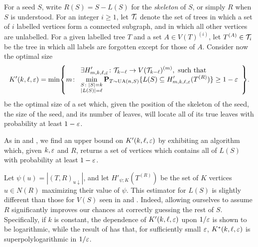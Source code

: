 
For a seed $S$, write $R(S) = S - L(S)$ for the \emph{skeleton} of
$S$, or simply $R$ when $S$ is understood. For an integer $i \ge 1$,
let $\mathcal{T}_i$ denote the set of trees in which a set of $i$ labelled
vertices form a connected subgraph, and in which all other vertices
are unlabelled. For a given labelled tree $T$ and a set
$A \in V(T)^{(i)}$, let $T^{(A)} \in \mathcal{T}_i$ be the tree in which all
labels are forgotten except for those of $A$. Consider now the optimal
size
\[
  K'(k, \ell, \eps) = \min\left\{ m \colon 
    \begin{array}{l} \displaystyle
      \exists H'_{m, k, \ell, \eps}
  \colon \sT_{k - \ell} \to V(\sT_{k - \ell})^{(m)} , \text{ such that} \\ \displaystyle
      \min\limits_{\substack{S \colon |S| = k \\ |L(S)| = \ell}} \Pr_{T
    \sim \UA(n, S)} \{L(S) \subseteq H'_{m, k, \ell, \eps}(T^{(R)})\}
  \ge 1 - \eps
      \end{array}
      \right\} .
\]
be the optimal size of a set which, given the position of the skeleton
of the seed, the size of the seed, and its number of leaves, will
locate all of its true leaves with probability at least $1 - \varepsilon$.

As in  and , we find an upper bound on
$K'(k, \ell, \varepsilon)$ by exhibiting an algorithm which, given $k, \varepsilon$
and $R$, returns a set of vertices which contains all of $L(S)$ with
probability at least $1 - \varepsilon$.

Let $\psi(u) = |(T, R)_{u \downarrow}|$, and let
$H'_{\psi; K}(T^{(R)})$ be the set of $K$ vertices $u \in N(R)$
maximizing their value of $\psi$. This estimator for $L(S)$ is
slightly different than those for $V(S)$ seen in  and
. Indeed, allowing ourselves to assume $R$ significantly
improves our chances at correctly guessing the rest of
$S$. Specifically, if $k$ is constant, the dependence of
$K'(k, \ell, \varepsilon)$ upon $1/\varepsilon$ is shown to be logarithmic, while
the result of  has that, for sufficiently small
$\varepsilon$, $K^*(k, \ell, \varepsilon)$ is superpolylogarithmic in $1/\varepsilon$.

